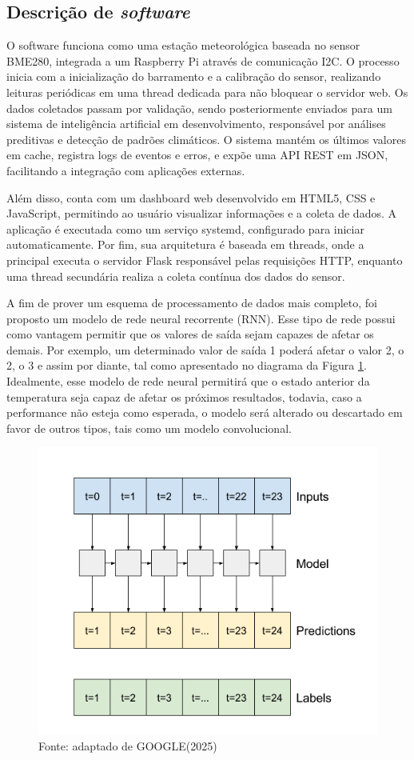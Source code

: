 \subsection{Descrição de \textit{software}}\label{subsec:software}

O software funciona como uma estação meteorológica baseada no sensor BME280, integrada a um Raspberry Pi através de comunicação I2C. O processo inicia com a inicialização do barramento e a calibração do sensor, realizando leituras periódicas em uma thread dedicada para não bloquear o servidor web. Os dados coletados passam por validação, sendo posteriormente enviados para um sistema de inteligência artificial em desenvolvimento, responsável por análises preditivas e detecção de padrões climáticos. O sistema mantém os últimos valores em cache, registra logs de eventos e erros, e expõe uma API REST em JSON, facilitando a integração com aplicações externas. 

Além disso, conta com um dashboard web desenvolvido em HTML5, CSS e JavaScript, permitindo ao usuário visualizar informações e a coleta de dados. A aplicação é executada como um serviço systemd, configurado para iniciar automaticamente. Por fim, sua arquitetura é baseada em threads, onde a principal executa o servidor Flask responsável pelas requisições HTTP, enquanto uma thread secundária realiza a coleta contínua dos dados do sensor.

A fim de prover um esquema de processamento de dados mais completo, foi proposto um modelo de rede neural recorrente (RNN). Esse tipo de rede possui como vantagem permitir que os valores de saída sejam capazes de afetar os demais. Por exemplo, um determinado valor de saída 1 poderá afetar o valor 2, o 2, o 3 e assim por diante, tal como apresentado no diagrama da Figura \ref{fig:tensorflow1}. Idealmente, esse modelo de rede neural permitirá que o estado anterior da temperatura seja capaz de afetar os próximos resultados, todavia, caso a performance não esteja como esperada, o modelo será alterado ou descartado em favor de outros tipos, tais como um modelo convolucional.

\begin{figure}[!ht]
    \centering
    \includegraphics[width=.45\textwidth]{figuras/lstm_many_window.png}
    \caption{Fonte: adaptado de GOOGLE(2025)\cite{tensorflow-structured-data-tutorial}}
    \label{fig:tensorflow1}
\end{figure}

